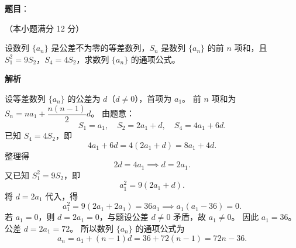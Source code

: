 \begin{answer}

\textbf{题目}：

（本小题满分 12 分）

设数列 $\{a_n\}$ 是公差不为零的等差数列，$S_n$ 是数列 $\{a_n\}$ 的前 $n$ 项和，且 $S_1^2=9S_2$，$S_4=4S_2$，求数列 $\{a_n\}$ 的通项公式。

\textbf{解析}

设等差数列 $\{a_n\}$ 的公差为 $d$（$d\neq 0$），首项为 $a_1$。
前 $n$ 项和为 $S_n=na_1+\dfrac{n(n-1)}{2}d$。
由题意：
\nopagebreak[4]
\[
S_1=a_1,\quad S_2=2a_1+d,\quad S_4=4a_1+6d.
\]
已知 $S_4=4S_2$，即
\nopagebreak[4]
\[
4a_1+6d=4(2a_1+d)=8a_1+4d.
\]
整理得
\nopagebreak[4]
\[
2d=4a_1 \implies d=2a_1.
\]
又已知 $S_1^2=9S_2$，即
\nopagebreak[4]
\[
a_1^2=9(2a_1+d).
\]
将 $d=2a_1$ 代入，得
\nopagebreak[4]
\[
a_1^2=9(2a_1+2a_1)=36a_1 \implies a_1(a_1-36)=0.
\]
若 $a_1=0$，则 $d=2a_1=0$，与题设公差 $d\neq 0$ 矛盾，故 $a_1\neq 0$。
因此 $a_1=36$。
公差 $d=2a_1=72$。
所以数列 $\{a_n\}$ 的通项公式为
\nopagebreak[4]
\[
a_n=a_1+(n-1)d=36+72(n-1)=72n-36.
\]


\end{answer}

